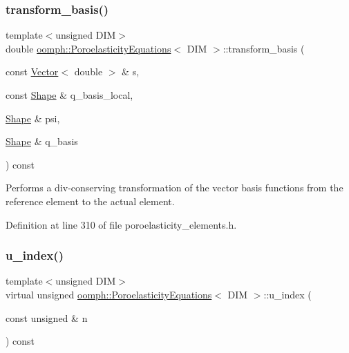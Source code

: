 \subsubsection{\texorpdfstring{transform\+\_\+basis()}{transform\_basis()}\hspace{0.1cm}{\footnotesize\ttfamily [2/2]}}
{\footnotesize\ttfamily template$<$unsigned D\+IM$>$ \\
double \hyperlink{classoomph_1_1PoroelasticityEquations}{oomph\+::\+Poroelasticity\+Equations}$<$ D\+IM $>$\+::transform\+\_\+basis (\begin{DoxyParamCaption}\item[{const \hyperlink{classoomph_1_1Vector}{Vector}$<$ double $>$ \&}]{s,  }\item[{const \hyperlink{classoomph_1_1Shape}{Shape} \&}]{q\+\_\+basis\+\_\+local,  }\item[{\hyperlink{classoomph_1_1Shape}{Shape} \&}]{psi,  }\item[{\hyperlink{classoomph_1_1Shape}{Shape} \&}]{q\+\_\+basis }\end{DoxyParamCaption}) const\hspace{0.3cm}{\ttfamily [inline]}}



Performs a div-\/conserving transformation of the vector basis functions from the reference element to the actual element. 



Definition at line 310 of file poroelasticity\+\_\+elements.\+h.

\mbox{\label{classoomph_1_1PoroelasticityEquations_a3fe57176b22729d251b13e0eb4e7d8fc}} 
\subsubsection{\texorpdfstring{u\+\_\+index()}{u\_index()}}
{\footnotesize\ttfamily template$<$unsigned D\+IM$>$ \\
virtual unsigned \hyperlink{classoomph_1_1PoroelasticityEquations}{oomph\+::\+Poroelasticity\+Equations}$<$ D\+IM $>$\+::u\+\_\+index (\begin{DoxyParamCaption}\item[{const unsigned \&}]{n }\end{DoxyParamCaption}) const\hspace{0.3cm}{\ttfamily [pure virtual]}}



